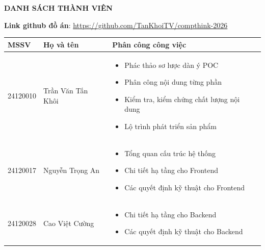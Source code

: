 \newpage

\begin{center}
    \Large\textbf{DANH SÁCH THÀNH VIÊN}
\end{center}

\noindent\textbf{Link github đồ án}: \url{https://github.com/TanKhoiTV/compthink-2026}

\begin{table}[H]
    \centering
    \renewcommand{\arraystretch}{1.3}
    \setlength{\tabcolsep}{6pt}
    \setlength{\arrayrulewidth}{1pt}

    \begin{tabularx}{\textwidth}{|p{2cm}|p{4cm}|X|}
        \hline
        \rowcolor[rgb]{0.8, 0.9, 1.0}
        \textbf{MSSV} & \textbf{Họ và tên} & \textbf{Phân công công việc} \\ \hline

        24120010 & Trần Văn Tấn Khôi &
        \vspace{-0.5\baselineskip}
        \begin{itemize}[itemsep=0pt, topsep=0pt, partopsep=0pt, parsep=0pt]
            \item Phác thảo sơ lược dàn ý POC
            \item Phân công nội dung từng phần
            \item Kiểm tra, kiểm chứng chất lượng nội dung
            \item Lộ trình phát triển sản phẩm
        \end{itemize} \\ \hline

        24120017 & Nguyễn Trọng An &
        \vspace{-0.5\baselineskip}
        \begin{itemize}[itemsep=0pt, topsep=0pt, partopsep=0pt, parsep=0pt]
            \item Tổng quan cấu trúc hệ thống
            \item Chi tiết hạ tầng cho Frontend
            \item Các quyết định kỹ thuật cho Frontend
        \end{itemize} \\ \hline

        24120028 & Cao Việt Cường & 
        \vspace{-0.5\baselineskip}
        \begin{itemize}[itemsep=0pt, topsep=0pt, partopsep=0pt, parsep=0pt]
            \item Chi tiết hạ tầng cho Backend
            \item Các quyết định kỹ thuật cho Backend 
        \end{itemize} \\ \hline


\end{tabularx}
\end{table}
